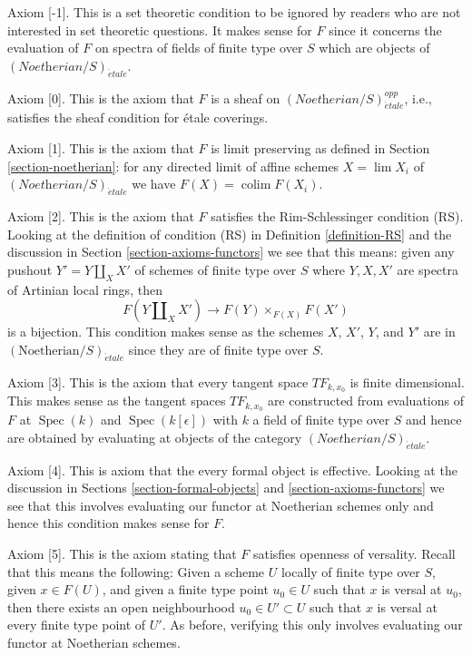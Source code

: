 \documentclass{stacks-project}
\theoremstyle{plain}
\theoremstyle{definition}
\theoremstyle{remark}
\numberwithin{equation}{subsection}
\def\lim{\mathop{\mathrm{lim}}\nolimits}
\def\colim{\mathop{\mathrm{colim}}\nolimits}
\def\Spec{\mathop{\mathrm{Spec}}}
\def\etale{{\acute{e}tale}}
\begin{document}
\medskip\noindent
Axiom [-1]. This is a set theoretic condition to be ignored
by readers who are not interested in set theoretic questions.
It makes sense for $F$ since it concerns the evaluation of
$F$ on spectra of fields of finite type over $S$ which are
objects of $(\textit{Noetherian}/S)_\etale$.

\medskip\noindent
Axiom [0]. This is the axiom that $F$ is a sheaf
on $(\textit{Noetherian}/S)_\etale^{opp}$, i.e., satisfies
the sheaf condition for \'etale coverings.

\medskip\noindent
Axiom [1]. This is the axiom that $F$ is limit preserving as defined
in Section \ref{section-noetherian}:  for any
directed limit of affine schemes $X = \lim X_i$ of
$(\textit{Noetherian}/S)_\etale$ we have $F(X) = \colim F(X_i)$.

\medskip\noindent
Axiom [2]. This is the axiom that  $F$ satisfies the Rim-Schlessinger
condition (RS). Looking at the definition of condition (RS) in
Definition \ref{definition-RS} and the discussion in
Section \ref{section-axioms-functors}
we see that this means: given any pushout $Y' = Y \amalg_X X'$
of schemes of finite type over $S$ where $Y, X, X'$
are spectra of Artinian local rings, then
$$
F(Y \amalg_X X') \to F(Y) \times_{F(X)} F(X')
$$
is a bijection. This condition makes sense as the schemes
$X$, $X'$, $Y$, and $Y'$ are in $(\text{Noetherian}/S)_\etale$
since they are of finite type over $S$.

\medskip\noindent
Axiom [3]. This is the axiom that every tangent space $TF_{k, x_0}$
is finite dimensional. This makes sense as the tangent spaces $TF_{k, x_0}$
are constructed from evaluations of $F$ at $\Spec(k)$ and
$\Spec(k[\epsilon])$ with $k$ a field of finite type over $S$
and hence are obtained by evaluating at objects of the category
$(\textit{Noetherian}/S)_\etale$.

\medskip\noindent
Axiom [4]. This is axiom that the every formal object is effective.
Looking at the discussion in
Sections \ref{section-formal-objects} and \ref{section-axioms-functors}
we see that this involves evaluating our functor at Noetherian schemes
only and hence this condition makes sense for $F$.

\medskip\noindent
Axiom [5]. This is the axiom stating that $F$ satisfies openness of versality.
Recall that this means the following: Given a scheme $U$
locally of finite type over $S$, given $x \in F(U)$, and given
a finite type point $u_0 \in U$ such that $x$ is versal at $u_0$,
then there exists an open neighbourhood $u_0 \in U' \subset U$
such that $x$ is versal at every finite type point of $U'$.
As before, verifying this only involves evaluating
our functor at Noetherian schemes.
\end{document}
